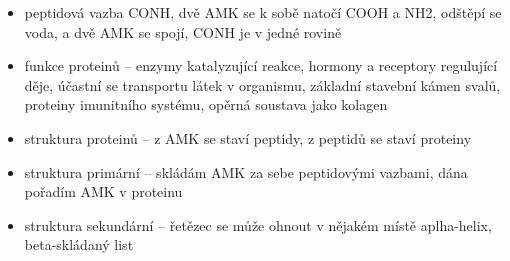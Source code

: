 \documentclass{article}
\begin{document}
\begin{itemize}
  \item peptidová vazba CONH, dvě AMK se k sobě natočí COOH a NH2, odštěpí se voda, a dvě AMK se spojí, CONH je v jedné rovině
  \item funkce proteinů -- enzymy katalyzující reakce, hormony a receptory regulující děje, účastní se transportu látek v organismu, základní stavební kámen svalů, proteiny imunitního systému, opěrná soustava jako kolagen
  \item struktura proteinů -- z AMK se staví peptidy, z peptidů se staví proteiny 
  \item struktura primární -- skládám AMK za sebe peptidovými vazbami, dána pořadím AMK v proteinu
  \item struktura sekundární -- řetězec se může ohnout v nějakém místě aplha-helix, beta-skládaný list
\end{itemize}
\end{document}
